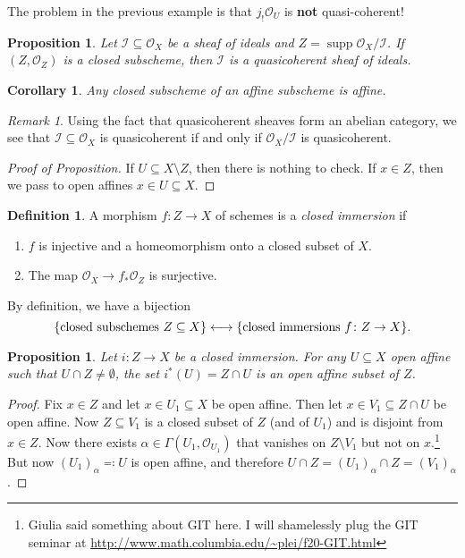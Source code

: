 \documentclass[leqno, openany]{memoir}
\newtheorem{cor}[thm]{Corollary}
\newtheorem{prop}[thm]{Proposition}
\theoremstyle{definition}
\newtheorem{defn}[thm]{Definition}
\theoremstyle{remark}
\newtheorem{rmk}[thm]{Remark}
\theoremstyle{plain}
\theoremstyle{definition}
\theoremstyle{remark}
\newcommand{\mc}[1]{\mathcal{#1}}
\DeclareMathOperator{\supp}{supp}
\begin{document}
The problem in the previous example is that $j_! \mc{O}_U$ is \textbf{not} quasi-coherent!

\begin{prop}
    Let $\mc{I} \subseteq \mc{O}_X$ be a sheaf of ideals and $Z = \supp \mc{O}_X/\mc{I}$. If $(Z, \mc{O}_Z)$ is a closed subscheme, then $\mc{I}$ is a quasicoherent sheaf of ideals.
\end{prop}

\begin{cor}
    Any closed subscheme of an affine subscheme is affine.
\end{cor}

\begin{rmk}
    Using the fact that quasicoherent sheaves form an abelian category, we see that $\mc{I} \subseteq \mc{O}_X$ is quasicoherent if and only if $\mc{O}_X/\mc{I}$ is quasicoherent.
\end{rmk}

\begin{proof}[Proof of Proposition]
    If $U \subseteq X \setminus Z$, then there is nothing to check. If $x \in Z$, then we pass to open affines $x \in U \subseteq X$.
\end{proof}

\begin{defn}
    A morphism $f \colon Z \to X$ of schemes is a \textit{closed immersion} if
    \begin{enumerate}
        \item $f$ is injective and a homeomorphism onto a closed subset of $X$.
        \item The map $\mc{O}_X \to f_* \mc{O}_Z$ is surjective.
    \end{enumerate}
    By definition, we have a bijection
    \[ \qty{\text{closed subschemes }Z \subseteq X} \longleftrightarrow \qty{\text{closed immersions } f \colon Z \to X}. \]
\end{defn}

\begin{prop}
    Let $i \colon Z \to X$ be a closed immersion. For any $U \subseteq X$ open affine such that $U \cap Z \neq \emptyset$, the set $i^* (U) = Z \cap U$ is an open affine subset of $Z$.
\end{prop}

\begin{proof}
    Fix $x \in Z$ and let $x \in U_1 \subseteq X$ be open affine. Then let $x \in V_1 \subseteq Z \cap U$ be open affine. Now $Z \subseteq V_1$ is a closed subset of $Z$ (and of $U_1$) and is disjoint from $x \in Z$. Now there exists $\alpha \in \Gamma(U_1, \mc{O}_{U_1})$ that vanishes on $Z \setminus V_1$ but not on $x$.\footnote{Giulia said something about GIT here. I will shamelessly plug the GIT seminar at \url{http://www.math.columbia.edu/~plei/f20-GIT.html}} But now ${(U_1)}_{\alpha} \eqqcolon U$ is open affine, and therefore $U \cap Z = {(U_1)}_{\alpha} \cap Z = {(V_1)}_{\alpha}$.
\end{proof}
\end{document}
